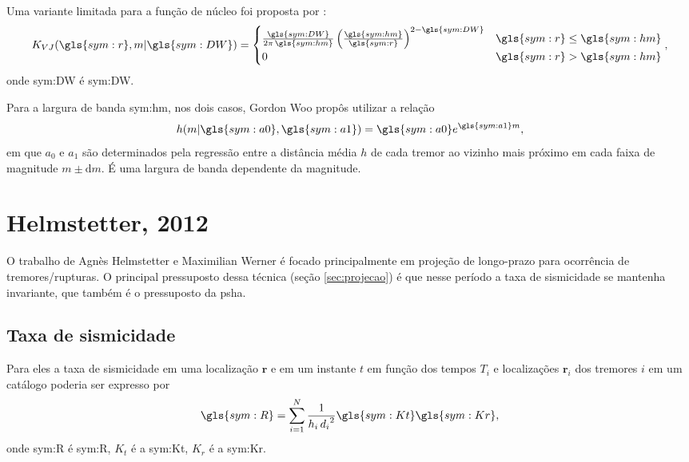 Uma variante limitada para a função de núcleo foi proposta por \citet{verejones_1992}:\begin{equation}
	\ensuremath{
		K_{VJ}(\gls{sym:r}, m \arrowvert \gls{sym:DW}) = 
		\begin{cases}
			\frac{\gls{sym:DW}}{2\pi\,\gls{sym:hm}} 
			\left( \frac{\gls{sym:hm}}{\gls{sym:r}} \right)^{2 - \gls{sym:DW}} 
			  & \gls{sym:r} \leq \gls{sym:hm} \\
			0 & \gls{sym:r} > \gls{sym:hm}
		\end{cases},
	}
	\label{eq:k_vj}
\end{equation}
onde \gls{sym:DW} é \glsdesc{sym:DW}.

Para a largura de banda \gls{sym:hm}, nos dois casos, Gordon Woo propôs utilizar a relação
\begin{equation}
	\ensuremath{
		h(m\arrowvert \gls{sym:a0}, \gls{sym:a1}) = \gls{sym:a0}e^{\gls{sym:a1}m},
	}
	\label{eq:hm}
\end{equation}
em que $a_0$ e $a_1$ são determinados pela regressão entre a 
distância média $h$ de cada tremor ao vizinho mais próximo em cada faixa de magnitude $m \pm \mathrm{d}m$.
É uma largura de banda dependente da magnitude.


\section{Helmstetter, 2012}
\label{sec:helmstetter}

O trabalho de  Agnès Helmstetter e Maximilian Werner \citep{helmstetter_2012} é focado principalmente em 
projeção de longo-prazo para ocorrência de tremores/rupturas. 
O principal pressuposto dessa técnica (seção \ref{sec:projecao}) é que nesse período a taxa
de sismicidade se mantenha invariante, que também é o pressuposto da \gls{psha}.

\subsection{Taxa de sismicidade}
Para eles a taxa de sismicidade em uma localização
$\boldsymbol{r}$ e em um instante $t$ 
em função dos tempos $T_i$ e localizações $\mathbf{r}_i$ dos tremores $i$ em um catálogo 
poderia ser expresso por
\begin{equation}
	\ensuremath{\gls{sym:R} = \sum_{i=1}^{N}{ \frac{1}{h_i\,{d_i}^2} \gls{sym:Kt}\gls{sym:Kr} }},
	\label{eq:helms01}
\end{equation}
onde \gls{sym:R} é \glsdesc{sym:R}, 
	  $K_t$ é a \glsdesc{sym:Kt}, 
	  $K_r$ é a \glsdesc{sym:Kr}.

